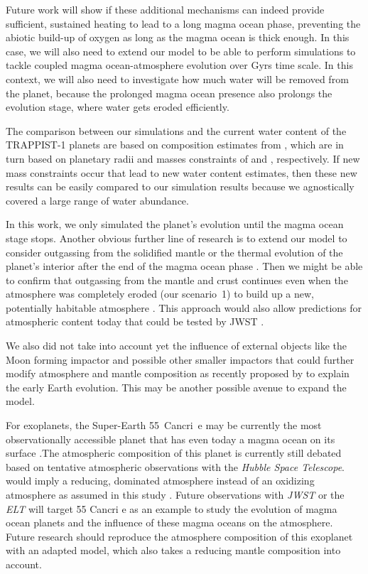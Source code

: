 \documentclass[oneside,twocolumn]{article}
\begin{document}
Future work will show if these additional mechanisms can indeed provide sufficient, sustained heating to lead to a long magma ocean phase, preventing the abiotic build-up of oxygen as long as the magma ocean is thick enough. In this case, we will also need to extend our model to be able to perform simulations to tackle coupled magma ocean-atmosphere evolution over Gyrs time scale. In this context, we will also need to investigate how much water will be removed from the planet, because the prolonged magma ocean presence also prolongs the evolution stage, where water gets eroded efficiently.

The comparison between our simulations and the current water content of the TRAPPIST-1 planets are based on composition estimates from \citet{Dorn2018}, which are in turn based on planetary radii and masses constraints of \citet{Delrez2018} and \citet{Grimm2018}, respectively. If new mass constraints occur that lead to new water content estimates, then these new results can be easily compared to our simulation results because we agnostically covered a large range of water abundance.

In this work, we only simulated the planet's evolution until the magma ocean stage stops. Another obvious further line of research is to extend our model to consider outgassing from the solidified mantle or the thermal evolution of the planet's interior after the end of the magma ocean phase \citep[Garcia et al., in prep.]{Driscoll2013}. Then we might be able to confirm that outgassing from the mantle and crust continues even when the atmosphere was completely eroded (our scenario~1) to build up a new, potentially habitable atmosphere \citep{Godolt2019}. This approach would also allow predictions for atmospheric content today that could be tested by JWST \citep{Wunderlich2019}.

We also did not take into account yet the influence of external objects like the Moon forming impactor and possible other smaller impactors that could further modify atmosphere and mantle composition as recently proposed by \citet{zahnle2019} to explain the early Earth evolution. This may be another possible avenue to expand the model.

For exoplanets, the Super-Earth 55~Cancri~e may be currently the most observationally accessible planet that has even today a magma ocean on its surface \citep{Demory2016}.The atmospheric composition of this planet is currently still debated based on tentative atmospheric  observations with the \textit{Hubble Space Telescope}.  would imply a reducing,  dominated atmosphere instead of an oxidizing atmosphere as assumed in this study \citep{Tsiaras2016,Hammond2017,Zilinskas2020}.
Future observations with \textit{JWST} or the \textit{ELT} will target 55 Cancri e as an example to study the evolution of magma ocean planets and the influence of these magma oceans on the atmosphere. Future research should reproduce the atmosphere composition of this exoplanet with an adapted model, which also takes a reducing mantle composition into account. 
\end{document}
